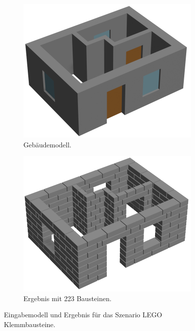 \begin{figure}[htb]
  \begin{subfigure}[b]{0.49\columnwidth}
    \includegraphics[width=\columnwidth]{fig/scenario2_rendering_input.png}
    \caption{Gebäudemodell.}\label{fig:poc:scenario2 modell}
  \end{subfigure}
  \hfill
  \begin{subfigure}[b]{0.49\columnwidth}
    \includegraphics[width=\columnwidth]{fig/scenario2_render.png}
    \caption{Ergebnis mit 223 Bausteinen.}\label{fig:poc:scenario2_ergebnis}
  \end{subfigure}
\caption{Eingabemodell und Ergebnis für das Szenario LEGO Klemmbausteine.}\label{fig:poc:result_scenario2}
\end{figure}

